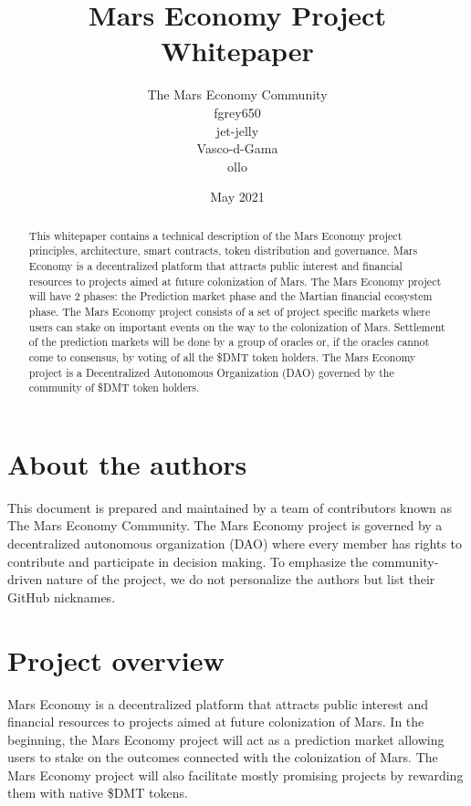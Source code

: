 \documentclass[12pt]{article}
\title{Mars Economy Project Whitepaper}
\author{
  The Mars Economy Community\\
  fgrey650\\
  jet-jelly\\
  Vasco-d-Gama\\
  ollo\\
}
\date{May 2021}
\begin{document}
\maketitle


\begin{abstract}
This whitepaper contains a technical description of the Mars Economy project principles, architecture, smart contracts, token distribution and governance. Mars Economy is a decentralized platform that attracts public interest and financial resources to projects aimed at future colonization of Mars. The Mars Economy project will have 2 phases: the Prediction market phase and the Martian financial ecosystem phase. The Mars Economy project consists of a set of project specific markets where users can stake on important events on the way to the colonization of Mars. Settlement of the prediction markets will be done by a group of oracles or, if the oracles cannot come to consensus, by voting of all the \$DMT token holders. The Mars Economy project is a Decentralized Autonomous Organization (DAO) governed by the community of \$DMT token holders.
\end{abstract}


\section{About the authors}

This document is prepared and maintained by a team of contributors known as The Mars Economy Community. The Mars Economy project is governed by a decentralized autonomous organization (DAO) where every member has rights to contribute and participate in decision making. To emphasize the community-driven nature of the project, we do not personalize the authors but list their GitHub nicknames.

\section{Project overview}

Mars Economy is a decentralized platform that attracts public interest and financial resources to projects aimed at future colonization of Mars. In the beginning, the Mars Economy project will act as a prediction market allowing users to stake on the outcomes connected with the colonization of Mars. The Mars Economy project will also facilitate mostly promising projects by rewarding them with native \$DMT tokens.
\end{document}
